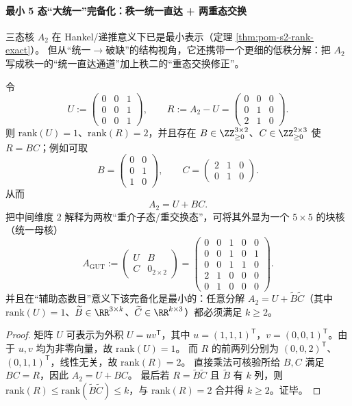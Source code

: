 \paragraph{最小 5 态“大统一”完备化：秩一统一直达 + 两重态交换}
三态核 \(A_2\) 在 Hankel/递推意义下已是最小表示（定理 \ref{thm:pom-s2-rank-exact}）。
但从“统一$\to$破缺”的结构视角，它还携带一个更细的低秩分解：把 \(A_2\) 写成秩一的“统一直达通道”加上秩二的“重态交换修正”。

\begin{proposition}\label{prop:pom-a2-gut-completion}
令
\[
U:=
\begin{pmatrix}
0&0&1\\
0&0&1\\
0&0&1
\end{pmatrix},
\qquad
R:=A_2-U=
\begin{pmatrix}
0&0&0\\
0&1&0\\
2&1&0
\end{pmatrix}.
\]
则 \(\mathrm{rank}(U)=1\)、\(\mathrm{rank}(R)=2\)，并且存在 \(B\in\ZZ_{\ge 0}^{3\times 2}\)、\(C\in\ZZ_{\ge 0}^{2\times 3}\) 使 \(R=BC\)；例如可取
\[
B=
\begin{pmatrix}
0&0\\
0&1\\
1&0
\end{pmatrix},
\qquad
C=
\begin{pmatrix}
2&1&0\\
0&1&0
\end{pmatrix}.
\]
从而
\[
A_2=U+BC.
\]
把中间维度 \(2\) 解释为两枚“重介子态/重交换态”，可将其外显为一个 \(5\times 5\) 的块核（统一母核）
\[
A_{\mathrm{GUT}}
:=
\begin{pmatrix}
U & B\\
C & 0_{2\times 2}
\end{pmatrix}
=
\begin{pmatrix}
0&0&1&0&0\\
0&0&1&0&1\\
0&0&1&1&0\\
2&1&0&0&0\\
0&1&0&0&0
\end{pmatrix}.
\]
并且在“辅助态数目”意义下该完备化是最小的：任意分解 \(A_2=U+\widetilde B\widetilde C\)（其中 \(\mathrm{rank}(U)=1\)、\(\widetilde B\in\RR^{3\times k}\)、\(\widetilde C\in\RR^{k\times 3}\)）都必须满足 \(k\ge 2\)。
\end{proposition}
\begin{proof}
矩阵 \(U\) 可表示为外积 \(U=uv^{\mathsf T}\)，其中 \(u=(1,1,1)^{\mathsf T}\)，\(v=(0,0,1)^{\mathsf T}\)。由于 \(u, v\) 均为非零向量，故 \(\mathrm{rank}(U)=1\)。
而 \(R\) 的前两列分别为 \((0,0,2)^{\mathsf T}\)、\((0,1,1)^{\mathsf T}\)，线性无关，故 \(\mathrm{rank}(R)=2\)。
直接乘法可核验所给 \(B,C\) 满足 \(BC=R\)，因此 \(A_2=U+BC\)。
最后若 \(R=\widetilde B\widetilde C\) 且 \(\widetilde B\) 有 \(k\) 列，则 \(\mathrm{rank}(R)\le \mathrm{rank}(\widetilde B\widetilde C)\le k\)，与 \(\mathrm{rank}(R)=2\) 合并得 \(k\ge 2\)。证毕。
\end{proof}


